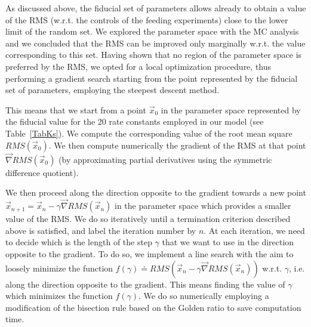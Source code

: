 \documentclass[oneside, 10pt, a4paper, twocolumn]{article}
\begin{document}
As discussed above, the fiducial set of parameters allows already to obtain a value of the RMS (w.r.t. the controls of the feeding experiments) close to the lower limit of the random set. We explored the parameter space with the MC analysis and we concluded that the RMS can be improved only marginally w.r.t. the value corresponding to this set. %
Having shown that no region of the parameter space is preferred by the RMS, we opted for a local optimization procedure, thus performing a gradient search starting from the point represented by the fiducial set of parameters, 
employing the steepest descent method. 

This means that we start from a point $\vec{x}_0$ in the parameter space represented by the fiducial value for the 20 rate constants employed in our model (see Table~\ref{TabKs}). We compute the corresponding value of the root mean square $RMS\left(\vec{x}_0\right)$. We then compute numerically the gradient of the RMS at that point $\vec{\nabla}RMS\left(\vec{x}_0\right)$ (by approximating partial derivatives using the symmetric difference quotient). 


We then proceed along the direction opposite to the gradient towards a new point \mbox{$\vec{x}_{n+1} = \vec{x}_{n} - \gamma\vec{\nabla}RMS\left(\vec{x}_n\right)$} in the parameter space which provides a smaller value of the RMS. We do so iteratively until a termination criterion described above is satisfied, and label the iteration number by $n$.
At each iteration, we need to decide which is the length of the step $\gamma$ that we want to use in the direction opposite to the gradient. To do so, we implement a line search with the aim to loosely minimize the function $f\left(\gamma\right) \doteq RMS\left(\vec{x}_{n} - \gamma\vec{\nabla}RMS\left(\vec{x}_n\right)\right)$ w.r.t. $\gamma$, i.e. along the direction opposite to the gradient. This means finding the value of $\gamma$ which minimizes the function $f\left(\gamma\right)$. We do so numerically employing a modification of the bisection rule based on the Golden ratio to save computation time. 
\end{document}

